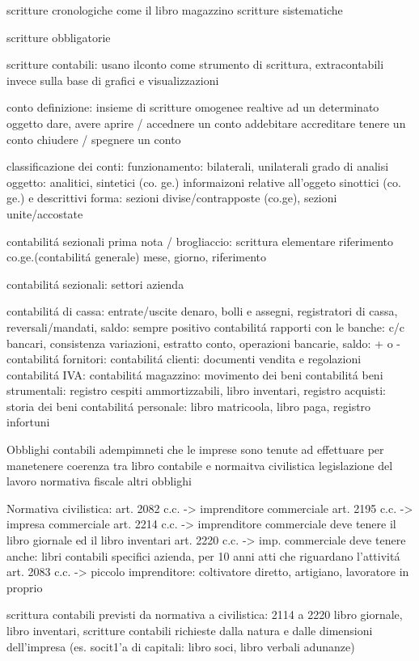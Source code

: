 \documentclass{article}
\begin{document}
scritture cronologiche come il libro magazzino
scritture sistematiche

scritture obbligatorie

scritture contabili: usano ilconto come strumento di scrittura,
extracontabili invece sulla base di grafici e visualizzazioni

conto
definizione: insieme di scritture omogenee realtive ad un determinato oggetto
dare, avere
aprire / accednere un conto
addebitare
accreditare
tenere un conto
chiudere / spegnere un conto

classificazione dei conti:
funzionamento: bilaterali, unilaterali
grado di analisi oggetto: analitici, sintetici (co. ge.)
informaizoni relative all'oggeto sinottici (co. ge.) e descrittivi
forma: sezioni divise/contrapposte (co.ge), sezioni unite/accostate

contabilit\'a sezionali
prima nota / brogliaccio: scrittura elementare riferimento co.ge.(contabilit\'a generale)
mese, giorno, riferimento

contabilit\'a sezionali: settori azienda

contabilit\'a di cassa: entrate/uscite denaro, bolli e assegni, registratori di cassa, reversali/mandati, saldo: sempre positivo
contabilit\'a rapporti con le banche: c/c bancari, consistenza variazioni, estratto conto, operazioni bancarie, saldo: + o -
contabilit\'a fornitori: 
contabilit\'a clienti: documenti vendita e regolazioni
contabilit\'a IVA: 
contabilit\'a magazzino: movimento dei beni
contabilit\'a beni strumentali: registro cespiti ammortizzabili, libro inventari, registro acquisti: storia dei beni
contabilit\'a personale: libro matricoola, libro paga, registro infortuni

Obblighi contabili
adempimneti che le imprese sono tenute ad effettuare per manetenere coerenza tra libro contabile e 
normaitva civilistica
legislazione del lavoro
normativa fiscale
altri obblighi

Normativa civilistica:
art. 2082 c.c. -> imprenditore commerciale
art. 2195 c.c. -> impresa commerciale
art. 2214 c.c. -> imprenditore commerciale deve tenere il libro giornale ed il libro inventari
art. 2220 c.c. -> imp. commerciale deve tenere anche: libri contabili specifici azienda, per 10 anni atti che riguardano l'attivit\'a
art. 2083 c.c. -> piccolo imprenditore: coltivatore diretto, artigiano, lavoratore in proprio

scrittura contabili previsti da normativa a civilistica: 2114 a 2220
libro giornale, libro inventari, scritture contabili richieste dalla natura e dalle dimensioni dell'impresa (es. socit1'a di capitali: libro soci, libro verbali adunanze)
\end{document}
